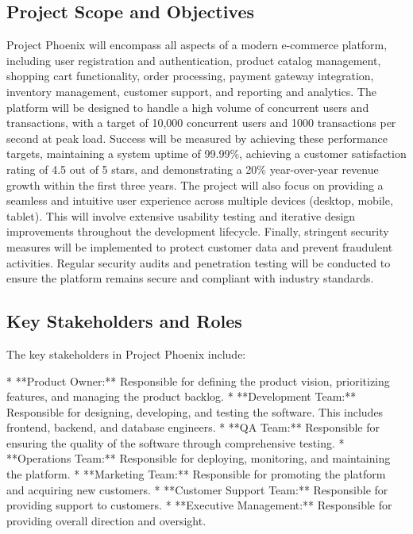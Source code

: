 \documentclass[11pt,a4paper,oneside]{article}
\begin{document}
\subsection{Project Scope and Objectives}

Project Phoenix will encompass all aspects of a modern e-commerce platform, including user registration and authentication, product catalog management, shopping cart functionality, order processing, payment gateway integration, inventory management, customer support, and reporting and analytics.  The platform will be designed to handle a high volume of concurrent users and transactions, with a target of 10,000 concurrent users and 1000 transactions per second at peak load.  Success will be measured by achieving these performance targets, maintaining a system uptime of 99.99\%, achieving a customer satisfaction rating of 4.5 out of 5 stars, and demonstrating a 20\% year-over-year revenue growth within the first three years.  The project will also focus on providing a seamless and intuitive user experience across multiple devices (desktop, mobile, tablet).  This will involve extensive usability testing and iterative design improvements throughout the development lifecycle.  Finally, stringent security measures will be implemented to protect customer data and prevent fraudulent activities.  Regular security audits and penetration testing will be conducted to ensure the platform remains secure and compliant with industry standards.

\subsection{Key Stakeholders and Roles}

The key stakeholders in Project Phoenix include:

* **Product Owner:** Responsible for defining the product vision, prioritizing features, and managing the product backlog.
* **Development Team:** Responsible for designing, developing, and testing the software.  This includes frontend, backend, and database engineers.
* **QA Team:** Responsible for ensuring the quality of the software through comprehensive testing.
* **Operations Team:** Responsible for deploying, monitoring, and maintaining the platform.
* **Marketing Team:** Responsible for promoting the platform and acquiring new customers.
* **Customer Support Team:** Responsible for providing support to customers.
* **Executive Management:** Responsible for providing overall direction and oversight.
\end{document}
